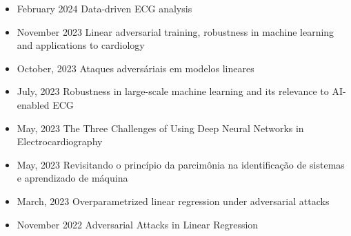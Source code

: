 \documentclass[10pt,A4]{article} %
\begin{document}
\begin{itemize}

    
        \item {}
    { February 2024 }
    { Data-driven ECG analysis  }
    { }{}
    
      
    
        \item {}
    { November 2023 }
    { Linear adversarial training, robustness in machine learning and applications to cardiology  }
    { }{}
    
      
    
        \item {}
    { October, 2023 }
    { Ataques adversáriais em modelos lineares  }
    { }{}
    
      
    
        \item {}
    { July, 2023 }
    { Robustness in large-scale machine learning and its relevance to AI-enabled ECG  }
    { }{}
    
      
    
        \item {}
    { May, 2023 }
    { The Three Challenges of Using Deep Neural Networks in Electrocardiography  }
    { }{}
    
      
    
        \item {}
    { May, 2023 }
    { Revisitando o princípio da parcimônia na identificação de sistemas e aprendizado de máquina  }
    { }{}
    
      
    
        \item {}
    { March, 2023 }
    { Overparametrized linear regression under adversarial attacks  }
    { }{}
    
      
    
        \item {}
    { November 2022 }
    { Adversarial Attacks in Linear Regression  }
    { }{}
    

\end{itemize}
\end{document}
